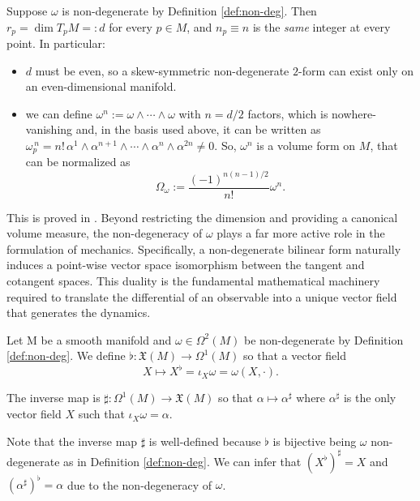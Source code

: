 \begin{corollary}\label{cor:omega-prop}
	Suppose $\omega$ is non-degenerate by Definition \ref{def:non-deg}. Then $r_p = \dim T_pM =: d$ for every $p \in M$, and $n_p \equiv n$ is the \emph{same} integer at every point. In particular:
	\begin{itemize}
		\item $d$ must be even, so a skew-symmetric non-degenerate $2$-form can exist only on an even-dimensional manifold.
		\item we can define $\omega^n := \omega \wedge \cdots \wedge \omega$ with $n=d/2$ factors, which is nowhere-vanishing and, in the basis used above, it can be written as $\omega_p^{\,n} = n!\,\alpha^1\wedge\alpha^{n+1}\wedge\cdots\wedge\alpha^n\wedge\alpha^{2n} \neq 0$. So, $\omega^n$ is a volume form on $M$, that can be normalized as
		\[
		\Omega_\omega := \frac{(-1)^{n(n-1)/2}}{n!} \omega^n.
		\]
	\end{itemize}
\end{corollary}

This is proved in \cite[Proposition 3.1.5]{abrahamFoundationsMechanics2008}. Beyond restricting the dimension and providing a canonical volume measure, the non-degeneracy of $\omega$ plays a far more active role in the formulation of mechanics. Specifically, a non-degenerate bilinear form naturally induces a point-wise vector space isomorphism between the tangent and cotangent spaces. This duality is the fundamental mathematical machinery required to translate the differential of an observable into a unique vector field that generates the dynamics.

\begin{definition}\label{def:musical}
	Let M be a smooth manifold and $\omega \in \Omega^2(M)$ be non-degenerate by Definition \ref{def:non-deg}. We define $\flat :\mathfrak{X}(M) \to \Omega^1(M)$ so that a vector field $$X \mapsto X^\flat = \iota_X\omega = \omega(X, \cdot).$$ 
	
	The inverse map is $\sharp: \Omega^1(M) \to \mathfrak{X}(M)$ so that $\alpha \mapsto \alpha^\sharp$ where $\alpha^\sharp$ is the only vector field $X$ such that $\iota_X \omega= \alpha$.
\end{definition}

\begin{remark}
	Note that the inverse map $\sharp$ is well-defined because $\flat$ is bijective being $\omega$ non-degenerate as in Definition \ref{def:non-deg}. We can infer that $(X^\flat)^\sharp = X$ and $(\alpha^\sharp)^\flat = \alpha$ due to the non-degeneracy of $\omega$.
\end{remark}

